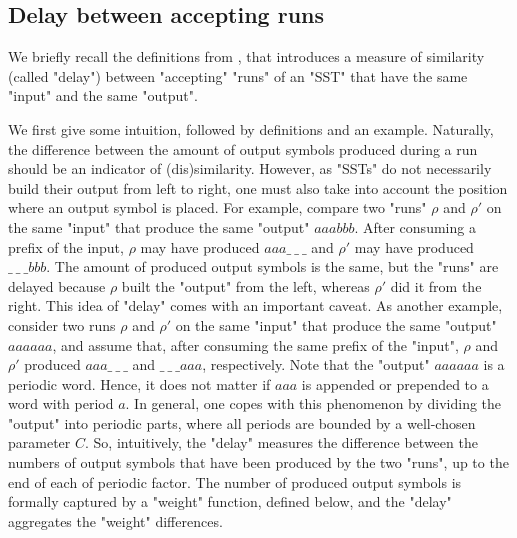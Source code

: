 \documentclass{theoretics}
\begin{document}
\subsection{Delay between accepting runs}\label{subsec:delay}

We briefly recall the definitions from \cite{SSTdelay}, that introduces
a measure of similarity (called "delay")
between "accepting" "runs" of an "SST" that have the same "input" and the same "output".

We first give some intuition, followed by definitions and an example.
Naturally, the difference between the amount of output symbols produced during a run should be an indicator of (dis)similarity. 
However, as "SSTs" do not necessarily build their output 
from left to right, one must also take into account 
the position where an output symbol is placed.
For example, compare two "runs" $\rho$ and $\rho'$ 
on the same "input" that produce the same "output" 
$aaabbb$. %
After consuming a prefix of the input, 
$\rho$ may have produced 
$aaa\_\ \_\ \_$ 
and $\rho'$ may have produced 
$\_\ \_\ \_bbb$. 
The amount of produced output symbols is the same,
but the "runs" are delayed because $\rho$ 
built the "output" from the left, 
whereas $\rho'$ did it from the right.
This idea of "delay" comes with an important caveat.
As another example, consider two runs $\rho$ and $\rho'$ 
on the same "input" that produce the same "output" 
$aaaaaa$,
and assume that, after consuming the same prefix of the "input",
$\rho$ and $\rho'$ produced 
$aaa\_\ \_\ \_$ and $\_\ \_\ \_aaa$, respectively. 
Note that the "output" 
$aaaaaa$ is a periodic word. %
Hence, it does not matter if 
$aaa$ is appended or prepended to a word with period $a$. %
In general, one copes with this phenomenon 
by dividing the "output" into periodic parts,
where all periods are bounded by a well-chosen parameter $C$.
So, intuitively, the "delay" measures 
the difference between the numbers of output symbols that have 
been produced by the two "runs", up to the end of each of periodic factor. The number of produced output symbols is formally captured 
by a "weight" function, defined below, and the "delay" aggregates
the "weight" differences. 
\end{document}
